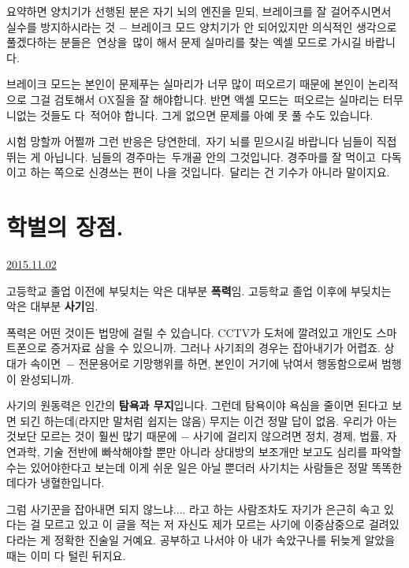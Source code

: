 요약하면
양치기가 선행된 분은 자기 뇌의 엔진을 믿되, 브레이크를 잘 걸어주시면서 실수를 방지하시라는 것 $-$ 브레이크 모드
양치기가 안 되어있지만 의식적인 생각으로 풀겠다하는 분들은 연상을 많이 해서 문제 실마리를 찾는 엑셀 모드로 가시길 바랍니다.
\vspace{5mm}

브레이크 모드는 본인이 문제푸는 실마리가 너무 많이 떠오르기 때문에 본인이 논리적으로 그걸 검토해서 OX질을 잘 해야합니다.
반면 액셀 모드는 떠오르는 실마리는 터무니없는 것들도 다 적어야 합니다. 그게 없으면 문제를 아예 못 풀 수도 있습니다.
\vspace{5mm}

시험 망할까 어쩔까 그런 반응은 당연한데, 자기 뇌를 믿으시길 바랍니다
님들이 직접 뛰는 게 아닙니다. 님들의 경주마는 두개골 안의 그것입니다.
경주마를 잘 먹이고 다독이고 하는 쪽으로 신경쓰는 편이 나을 것입니다. 달리는 건 기수가 아니라 말이지요.
\vspace{5mm}






\section{학벌의 장점.}
\href{https://www.kockoc.com/Apoc/460316}{2015.11.02}

\vspace{5mm}

고등학교 졸업 이전에 부딪치는 악은 대부분 \textbf{폭력}임.
고등학교 졸업 이후에 부딪치는 악은 대부분 \textbf{사기}임.
\vspace{5mm}

폭력은 어떤 것이든 법망에 걸릴 수 있습니다. CCTV가 도처에 깔려있고 개인도 스마트폰으로 증거자료 삼을 수 있으니까.
그러나 사기죄의 경우는 잡아내기가 어렵죠. 상대가 속이면 $-$ 전문용어로 기망행위를 하면, 본인이 거기에 낚여서 행동함으로써 범행이 완성되니까.
\vspace{5mm}

사기의 원동력은 인간의 \textbf{탐욕과 무지}입니다.
그런데 탐욕이야 욕심을 줄이면 된다고 보면 되긴 하는데(라지만 말처럼 쉽지는 않음)
무지는 이건 정말 답이 없음. 우리가 아는 것보단 모르는 것이 훨씬 많기 때문에 $-$
사기에 걸리지 않으려면 정치, 경제, 법률, 자연과학, 기술 전반에 빠삭해야할 뿐만 아니라
상대방의 보조개만 보고도 심리를 파악할 수는 있어야한다고 보는데 이게 쉬운 일은 아닐 뿐더러
사기치는 사람들은 정말 똑똑한 데다가 냉혈한입니다.
\vspace{5mm}

그럼 사기꾼을 잡아내면 되지 않느냐.... 라고 하는 사람조차도 자기가 은근히 속고 있다는 걸 모르고 있고
이 글을 적는 저 자신도 제가 모르는 사기에 이중삼중으로 걸려있다라는 게 정확한 진술일 거예요.
공부하고 나서야 아 내가 속았구나를 뒤늦게 알았을 때는 이미 다 털린 뒤지요.
\vspace{5mm}


